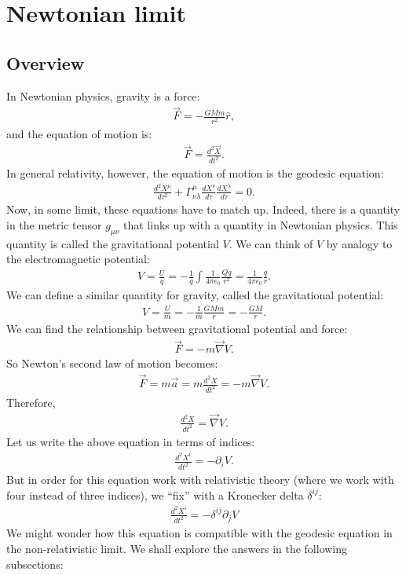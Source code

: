 \documentclass{book}
\theoremstyle{definition}
\begin{document}
\section{Newtonian limit}
\subsection{Overview}
In Newtonian physics, gravity is a force:
\begin{align*}
\vec{F} = -\frac{GMm}{r^2}\hat{r},
\end{align*}
and the equation of motion is:
\begin{align*}
\vec{F} = \frac{d^2\vec{X}}{dt^2}.
\end{align*}
In general relativity, however, the equation of motion is the geodesic equation:
\begin{align*}
\frac{d^2X^\mu}{d\tau^2} + \Gamma^\mu_{\nu\lambda}\frac{dX^\nu}{d\tau}\frac{dX^\lambda}{d\tau} = 0.
\end{align*}
Now, in some limit, these equations have to match up. Indeed, there is a quantity in the metric tensor $g_{\mu\nu}$ that links up with a quantity in Newtonian physics. This quantity is called the gravitational potential $V$. We can think of $V$ by analogy to the electromagnetic potential:
\begin{align*}
V = \frac{U}{q} = -\frac{1}{q}\int\frac{1}{4\pi\epsilon_0}\frac{Qq}{r^2} = \frac{1}{4\pi\epsilon_0}\frac{q}{r}.
\end{align*}
We can define a similar quantity for gravity, called the gravitational potential:
\begin{align*}
V = \frac{U}{m} = -\frac{1}{m}\frac{GMm}{r}= -\frac{GM}{r}.
\end{align*}
We can find the relationship between gravitational potential and force:
\begin{align*}
\vec{F} = -m\vec{\nabla}V.
\end{align*}
So Newton's second law of motion becomes:
\begin{align*}
\vec{F} = m\vec{a} = m\frac{d^2X}{dt^2} = -m\vec{\nabla}V.
\end{align*}
Therefore,
\begin{align*}
\frac{d^2X}{dt^2} = \vec{\nabla}V.
\end{align*}
Let us write the above equation in terms of indices:
\begin{align*}
\frac{d^2X^i}{dt^2} = -\partial_iV.
\end{align*}
But in order for this equation work with relativistic theory (where we work with four instead of three indices), we ``fix'' with a Kronecker delta $\delta^{ij}$:
\begin{align*}
\boxed{\frac{d^2X^i}{dt^2} = -\delta^{ij}\partial_jV}
\end{align*}
We might wonder how this equation is compatible with the geodesic equation in the non-relativistic limit. We shall explore the answers in the following subsections:
\end{document}
